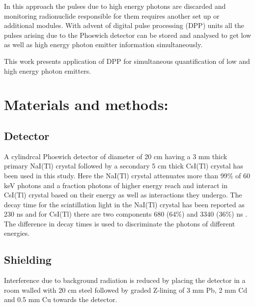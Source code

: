 \documentclass[10pt]{article}
\begin{document}
In this approach the pulses due to high energy photons are discarded and monitoring radionuclide responsible for them requires another set up or additional modules. With advent of digital pulse processing (DPP) units all the pulses arising due to the Phoswich detector can be stored and analysed to get low as well as high energy photon emitter information simultaneously. 

This work presents application of DPP for simultaneous quantification of low and high energy photon emitters.

\section*{Materials and methods:}  

\subsection*{Detector} A cylindrcal Phoswich detector of diameter of 20 cm having a 3 mm thick primary NaI(Tl) crystal followed by a secondary 5 cm thick CsI(Tl) crystal has been used in this study. Here the NaI(Tl) crystal attenuates more than 99\% of 60 keV photons and a fraction photons of higher energy reach and interact in CsI(Tl) crystal based on their energy as well as interactions they undergo. The decay time for the scintillation light in the NaI(Tl) crystal has been reported as 230 ns and for CsI(Tl) there are two components 680 (64\%) and 3340 (36\%) ns \cite{knoll2010radiation}. The difference in decay times is used to discriminate the photons of different energies.

\subsection*{Shielding}Interference due to background radiation is reduced by placing the detector in a room walled with 20 cm steel followed by graded Z-lining of 3 mm Pb, 2 mm Cd and 0.5 mm Cu towards the detector.
\end{document}

